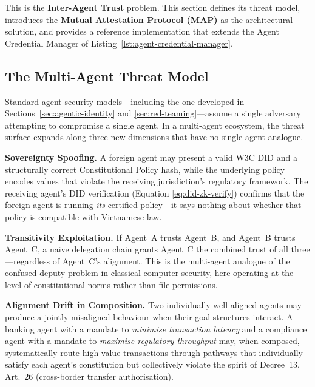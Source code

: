 This is the \textbf{Inter-Agent Trust} problem.  This section defines its
threat model, introduces the \textbf{Mutual Attestation Protocol (MAP)}
as the architectural solution, and provides a reference implementation that
extends the Agent Credential Manager of
Listing~\ref{lst:agent-credential-manager}.

\subsection{The Multi-Agent Threat Model}
\label{sec:map-threat-model}

Standard agent security models---including the one developed in
Sections~\ref{sec:agentic-identity} and \ref{sec:red-teaming}---assume a
single adversary attempting to compromise a single agent.  In a
multi-agent ecosystem, the threat surface expands along three new
dimensions that have no single-agent analogue.

\textbf{Sovereignty Spoofing.}  A foreign agent may present a valid W3C
DID and a structurally correct Constitutional Policy hash, while the
underlying policy encodes values that violate the receiving jurisdiction's
regulatory framework.  The receiving agent's DID verification (Equation
\ref{eq:did-zk-verify}) confirms that the foreign agent is running
\emph{its} certified policy---it says nothing about whether that policy is
compatible with Vietnamese law.

\textbf{Transitivity Exploitation.}  If Agent~A trusts Agent~B, and
Agent~B trusts Agent~C, a naive delegation chain grants Agent~C the
combined trust of all three---regardless of Agent~C's alignment.  This is
the multi-agent analogue of the confused deputy problem in classical
computer security, here operating at the level of constitutional norms
rather than file permissions.

\textbf{Alignment Drift in Composition.}  Two individually well-aligned
agents may produce a jointly misaligned behaviour when their goal structures
interact.  A banking agent with a mandate to \emph{minimise transaction
latency} and a compliance agent with a mandate to \emph{maximise regulatory
throughput} may, when composed, systematically route high-value transactions
through pathways that individually satisfy each agent's constitution but
collectively violate the spirit of Decree~13, Art.~26 (cross-border
transfer authorisation).

